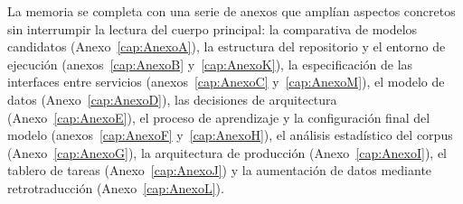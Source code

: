 La memoria se completa con una serie de anexos que amplían aspectos concretos sin interrumpir la lectura del cuerpo principal: la comparativa de modelos candidatos (Anexo~\ref{cap:AnexoA}), la estructura del repositorio y el entorno de ejecución (anexos~\ref{cap:AnexoB} y~\ref{cap:AnexoK}), la especificación de las interfaces entre servicios (anexos~\ref{cap:AnexoC} y~\ref{cap:AnexoM}), el modelo de datos (Anexo~\ref{cap:AnexoD}), las decisiones de arquitectura (Anexo~\ref{cap:AnexoE}), el proceso de aprendizaje y la configuración final del modelo (anexos~\ref{cap:AnexoF} y~\ref{cap:AnexoH}), el análisis estadístico del corpus (Anexo~\ref{cap:AnexoG}), la arquitectura de producción (Anexo~\ref{cap:AnexoI}), el tablero de tareas (Anexo~\ref{cap:AnexoJ}) y la aumentación de datos mediante retrotraducción (Anexo~\ref{cap:AnexoL}).
